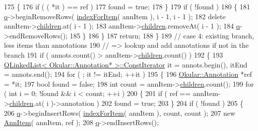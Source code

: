 \begin{DoxyCode}
175             \{
176                 \textcolor{keywordflow}{if} ( ( *it ) == ref )
177                     found = \textcolor{keyword}{true};
178             \}
179             \textcolor{keywordflow}{if} ( !found )
180             \{
181                 \hyperlink{classAnnotationModelPrivate_a106e8bd7ef602e10239b11d4a775647d}{q}->beginRemoveRows( \hyperlink{classAnnotationModelPrivate_a49c3cbd8328e431324be4fff9ac25926}{indexForItem}( annItem ), i - 1, i - 1 );
182                 \textcolor{keyword}{delete} annItem->\hyperlink{structAnnItem_a11048051ad0be5a2c8607a9334e006a1}{children}.at( i - 1 );
183                 annItem->\hyperlink{structAnnItem_a11048051ad0be5a2c8607a9334e006a1}{children}.removeAt( i - 1 );
184                 \hyperlink{classAnnotationModelPrivate_a106e8bd7ef602e10239b11d4a775647d}{q}->endRemoveRows();
185             \}
186         \}
187         \textcolor{keywordflow}{return};
188     \}
189     \textcolor{comment}{// case 4: existing branch, less items than annotations}
190     \textcolor{comment}{//         => lookup and add annotations if not in the branch}
191     \textcolor{keywordflow}{if} ( annots.count() > annItem->\hyperlink{structAnnItem_a11048051ad0be5a2c8607a9334e006a1}{children}.count() )
192     \{
193         \hyperlink{classQLinkedList}{QLinkedList< Okular::Annotation* >::ConstIterator} 
      it = annots.begin(), itEnd = annots.end();
194         \textcolor{keywordflow}{for} ( ; it != itEnd; ++it )
195         \{
196             \hyperlink{classOkular_1_1Annotation}{Okular::Annotation} *ref = *it;
197             \textcolor{keywordtype}{bool} found = \textcolor{keyword}{false};
198             \textcolor{keywordtype}{int} count = annItem->\hyperlink{structAnnItem_a11048051ad0be5a2c8607a9334e006a1}{children}.count();
199             \textcolor{keywordflow}{for} ( \textcolor{keywordtype}{int} i = 0; !found && i < count; ++i )
200             \{
201                 \textcolor{keywordflow}{if} ( ref == annItem->\hyperlink{structAnnItem_a11048051ad0be5a2c8607a9334e006a1}{children}.at( i )->annotation )
202                     found = \textcolor{keyword}{true};
203             \}
204             \textcolor{keywordflow}{if} ( !found )
205             \{
206                 \hyperlink{classAnnotationModelPrivate_a106e8bd7ef602e10239b11d4a775647d}{q}->beginInsertRows( \hyperlink{classAnnotationModelPrivate_a49c3cbd8328e431324be4fff9ac25926}{indexForItem}( annItem ), count, count );
207                 \textcolor{keyword}{new} \hyperlink{structAnnItem}{AnnItem}( annItem, ref );
208                 \hyperlink{classAnnotationModelPrivate_a106e8bd7ef602e10239b11d4a775647d}{q}->endInsertRows();

\end{DoxyCode}
